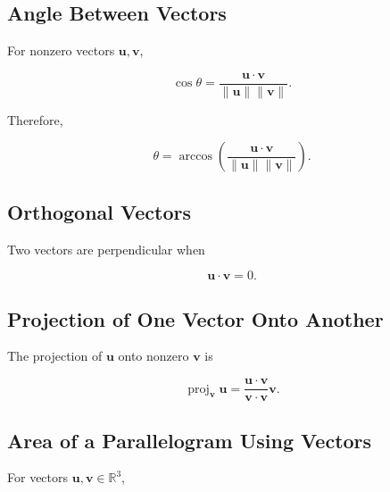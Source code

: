 \subsection{Angle Between Vectors}
\label{subsec:angle-between-vectors-reference}

For nonzero vectors \(\mathbf{u},\mathbf{v}\),

\[
\boxed{
\cos\theta
=
\frac{
\mathbf{u}\cdot\mathbf{v}
}{
\|\mathbf{u}\|
\|\mathbf{v}\|
}.
}
\]

Therefore,

\[
\boxed{
\theta
=
\arccos
\left(
\frac{
\mathbf{u}\cdot\mathbf{v}
}{
\|\mathbf{u}\|
\|\mathbf{v}\|
}
\right).
}
\]

\subsection{Orthogonal Vectors}
\label{subsec:orthogonal-vectors-reference}

Two vectors are perpendicular when

\[
\boxed{
\mathbf{u}\cdot\mathbf{v}=0.
}
\]

\subsection{Projection of One Vector Onto Another}
\label{subsec:vector-projection-reference}

The projection of \(\mathbf{u}\) onto nonzero \(\mathbf{v}\) is

\[
\boxed{
\operatorname{proj}_{\mathbf{v}}\mathbf{u}
=
\frac{
\mathbf{u}\cdot\mathbf{v}
}{
\mathbf{v}\cdot\mathbf{v}
}
\mathbf{v}.
}
\]

\subsection{Area of a Parallelogram Using Vectors}
\label{subsec:parallelogram-vector-area}

For vectors \(\mathbf{u},\mathbf{v}\in\mathbb{R}^3\),

